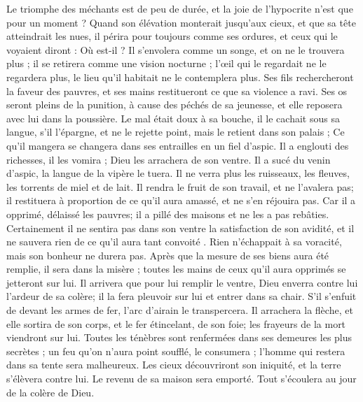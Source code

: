 \begin{multicols}{2}
Le triomphe des méchants est de peu de durée, et la joie de l'hypocrite n'est que pour un moment  ?
Quand son élévation monterait jusqu'aux cieux, et que sa tête atteindrait les nues,
il périra pour toujours comme ses ordures, et ceux qui le voyaient diront : Où est-il ?
Il s'envolera comme un songe, et on ne le trouvera plus ; il se  retirera comme une vision nocturne ;
l'œil qui le regardait ne le regardera plus, le lieu qu'il habitait ne le contemplera plus.
Ses fils rechercheront la faveur des pauvres, et ses mains restitueront ce que sa violence a ravi.
Ses os seront pleins de la punition, à  cause des péchés de sa jeunesse, et elle reposera avec lui dans la poussière.
Le mal était doux à sa bouche, il le cachait sous sa langue,
s'il l'épargne, et ne le rejette point, mais le retient dans son palais ; 
Ce qu'il mangera se changera dans ses entrailles en un fiel d'aspic.
Il a englouti des richesses, il les vomira ; Dieu les arrachera de son ventre.
Il a sucé du venin d'aspic, la langue de la vipère le tuera.
Il ne verra plus les ruisseaux, les fleuves, les torrents de miel et de lait.
Il rendra le fruit de son travail, et ne l'avalera pas; il restituera à proportion de ce qu'il aura amassé, et ne s'en réjouira pas.
Car il a opprimé, délaissé les pauvres; il a pillé des maisons et ne les a pas rebâties.
Certainement il ne sentira pas dans son ventre la satisfaction de son avidité, et il ne sauvera rien de ce qu'il aura tant convoité .
Rien n'échappait à sa voracité, mais son bonheur ne durera pas.
Après que la mesure de ses biens aura été remplie, il sera dans la misère ; toutes les mains de ceux qu'il aura opprimés se jetteront sur lui.
Il arrivera que pour lui remplir le ventre, Dieu enverra contre lui l'ardeur de sa colère; il la fera pleuvoir sur lui et entrer dans sa chair.
S’il s’enfuit de devant les armes de fer, l’arc d’airain le transpercera.
Il arrachera la flèche, et elle sortira de son corps, et le fer étincelant, de son foie; les frayeurs de la mort viendront sur lui.
Toutes les ténèbres sont renfermées dans ses demeures les plus secrètes ; un feu qu'on n'aura point soufflé, le consumera ; l'homme qui restera dans sa tente sera malheureux.
Les cieux découvriront son iniquité, et la terre s'élèvera contre lui. 
Le revenu de sa maison sera emporté. Tout s'écoulera au jour de la colère de Dieu.

\end{multicols}
